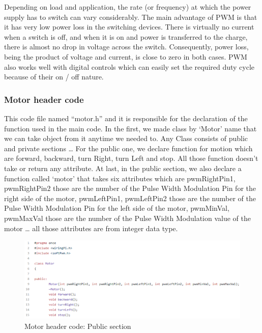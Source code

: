 \newpage

Depending on load and application, the rate (or frequency) at which the power supply has to switch can vary considerably. The main advantage of PWM is that it has very low power loss in the switching devices. There is virtually no current when a switch is off, and when it is on and power is transferred to the charge, there is almost no drop in voltage across the switch. Consequently, power loss, being the product of voltage and current, is close to zero in both cases. PWM also works well with digital controls which can easily set the required duty cycle because of their on / off nature.

\newpage
\subsubsection{Motor header code}

This code file named “motor.h” and it is responsible for the declaration of the function used in the main code. In the first, we made class by ‘Motor’ name that we can take object from it anytime we needed to. Any Class consists of public and private sections … For the public one, we declare function for motion which are forward, backward, turn Right, turn Left and stop. All those function doesn’t take or return any attribute. At last, in the public section, we also declare a function called ‘motor’ that takes six attributes which are pwmRightPin1, pwmRightPin2 those are the number of the Pulse Width Modulation Pin for the right side of the motor, pwmLeftPin1, pwmLeftPin2 those are the number of the Pulse Width Modulation Pin for the left side of the motor, pwmMinVal, pwmMaxVal those are the number of the Pulse Width Modulation value of the motor … all those attributes are from integer data type.
\newline
\begin{figure}[!h]
    \centering
    \includegraphics{figures/51.png}
    \caption{Motor header code: Public section}
    \label{fig:my_label}
\end{figure}


